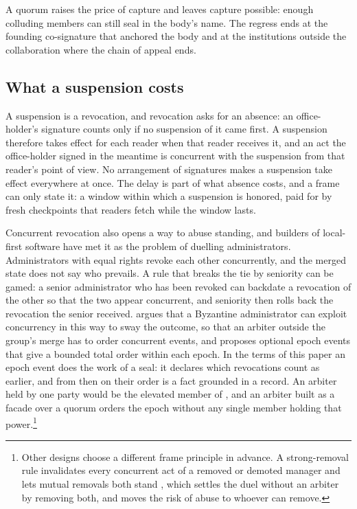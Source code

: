 A quorum raises the price of capture and leaves capture possible: enough colluding members can
still seal in the body's name. The regress ends at the founding co-signature that anchored the body
and at the institutions outside the collaboration where the chain of appeal ends.

\subsection{What a suspension costs}\label{sec:suspension}

A suspension is a revocation, and revocation asks for an absence: an office-holder's signature
counts only if no suspension of it came first. A suspension therefore takes effect for each reader
when that reader receives it, and an act the office-holder signed in the meantime is concurrent
with the suspension from that reader's point of view. No arrangement of signatures makes a
suspension take effect everywhere at once. The delay is part of what absence costs, and a frame can
only state it: a window within which a suspension is honored, paid for by fresh checkpoints that
readers fetch while the window lasts.

Concurrent revocation also opens a way to abuse standing, and builders of local-first software have
met it as the problem of duelling administrators. Administrators with equal rights revoke each
other concurrently, and the merged state does not say who prevails. A rule that breaks the tie by
seniority can be gamed: a senior administrator who has been revoked can backdate a revocation of the
other so that the two appear concurrent, and seniority then rolls back the revocation the senior
received. \citet{dougal2026} argues
that a Byzantine administrator can exploit concurrency in this way to sway the outcome, so that an
arbiter outside the group's merge has to order concurrent events, and proposes optional epoch events
that give a bounded total order within each epoch. In the terms of this paper an epoch event does
the work of a seal: it declares which revocations count as earlier, and from then on their order is
a fact grounded in a record. An arbiter held by one party would be the elevated member of
, and an arbiter built as a facade over a quorum orders the epoch without any
single member holding that power.\footnote{Other designs choose a different frame principle in
advance. A strong-removal rule invalidates every concurrent act of a removed or demoted manager and
lets mutual removals both stand \citep{p2panda-auth}, which settles the duel without an arbiter by
removing both, and moves the risk of abuse to whoever can remove.}

